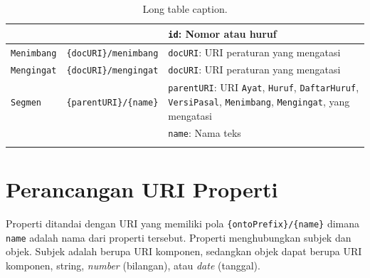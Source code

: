 \begin{longtable}{|p{}|p{}|p{}|}
                          &                                       & \texttt{id}: Nomor atau huruf                                                                                                                            \\ \hline
  \texttt{Menimbang}      & \texttt{\{docURI\}/menimbang}         & \texttt{docURI}: URI peraturan yang mengatasi                                                                                                            \\ \hline
  \texttt{Mengingat}      & \texttt{\{docURI\}/mengingat}         & \texttt{docURI}: URI peraturan yang mengatasi                                                                                                            \\ \hline
  \texttt{Segmen}         & \texttt{\{parentURI\}/\{name\}}       & \texttt{parentURI}: URI \texttt{Ayat}, \texttt{Huruf}, \texttt{DaftarHuruf}, \texttt{VersiPasal}, \texttt{Menimbang}, \texttt{Mengingat}, yang mengatasi \\
                          &                                       & \texttt{name}: Nama teks                                                                                                                                 \\ \hline
  \caption{Long table caption.\label{longs}}                                                                                                                                                                                 \\
\end{longtable}

\section{Perancangan URI Properti}\label{perancangan-uri-properti}

Properti ditandai dengan URI yang memiliki pola \texttt{\{ontoPrefix\}/\{name\}} dimana
\texttt{name} adalah nama dari properti tersebut. Properti menghubungkan subjek dan objek. Subjek
adalah berupa URI komponen, sedangkan objek dapat berupa URI komponen, string, \textit{number}
(bilangan), atau \textit{date} (tanggal).


